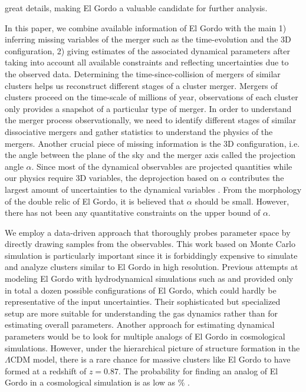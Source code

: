 great details, making El Gordo a valuable candidate for further analysis.
\par 
In this paper, we combine available information of El Gordo with the main
1) inferring missing variables of the merger
such as the time-evolution and the 3D configuration, 2) giving estimates of
the associated dynamical parameters after taking into account all available
constraints and reflecting uncertainties due to the observed data.
Determining the time-since-collision of mergers of similar clusters helps
us reconstruct different stages of a cluster merger.
Mergers of clusters proceed on the time-scale of millions of year,
observations of each cluster only provides a snapshot of a particular type
of merger. In order to understand the merger process observationally, 
we need to identify different stages of similar dissociative mergers and
gather statistics to understand the physics of the mergers.  
Another crucial piece of missing information is the 3D
configuration, i.e. the angle between the plane of the sky and the merger
axis called the projection angle $\alpha$. Since most of the dynamical
observables are projected quantities while our physics require 3D
variables, the deprojection based on $\alpha$ contributes the
largest amount of uncertainties to the dynamical variables .
From the morphology of the double relic of El Gordo, it is believed that
$\alpha$ should be small. However, there has not been any quantitative
constraints on the upper bound of $\alpha$.  
\par 
We employ a data-driven approach that thoroughly probes parameter
space by directly drawing samples from the observables. 
This work based on Monte Carlo simulation is particularly important since
it is forbiddingly expensive to simulate and analyze clusters similar to El
Gordo in high resolution. Previous attempts at modeling El Gordo with hydrodynamical
simulations such as \cite{Donnert13} and \cite{Molnar14} provided only in
total a dozen possible configurations of El Gordo, which could hardly be
representative of the input uncertainties. Their sophisticated but
specialized setup are more suitable for understanding the gas dynamics
rather than for estimating overall parameters. Another approach for
estimating dynamical parameters
would be to look for multiple analogs of El Gordo in cosmological
simulations.  However, under the hierarchical picture
of structure formation in the $\Lambda$CDM model, there is a rare chance
for massive clusters like El Gordo to have formed at a redshift of $z = 0.87$.  
The probability for finding an analog of El Gordo in a
cosmological simulation is as low as \% .  
\par

